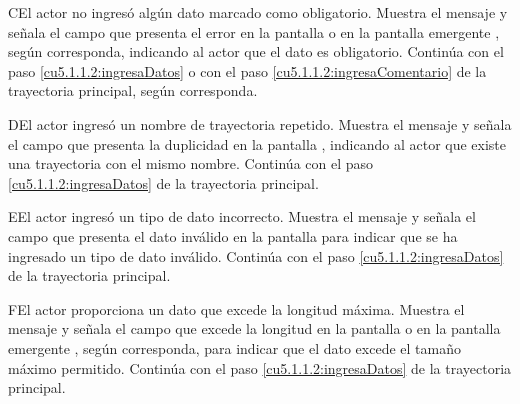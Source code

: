  \begin{UCtrayectoriaA}{C}{El actor no ingresó algún dato marcado como obligatorio.}
    \UCpaso[\UCsist] Muestra el mensaje  y señala el campo que presenta el error en la pantalla 
	     o en la pantalla emergente , según corresponda, indicando al actor que el dato es obligatorio.
    \UCpaso[] Continúa con el paso \ref{cu5.1.1.2:ingresaDatos} o con el paso \ref{cu5.1.1.2:ingresaComentario} de la trayectoria principal, según corresponda.
 \end{UCtrayectoriaA}
 \begin{UCtrayectoriaA}{D}{El actor ingresó un nombre de trayectoria repetido.}
    \UCpaso[\UCsist] Muestra el mensaje  y señala el campo que presenta la duplicidad en la pantalla 
	    , indicando al actor que existe una trayectoria con el mismo nombre.
    \UCpaso[] Continúa con el paso \ref{cu5.1.1.2:ingresaDatos} de la trayectoria principal.
 \end{UCtrayectoriaA}
 \begin{UCtrayectoriaA}{E}{El actor ingresó un tipo de dato incorrecto.}
    \UCpaso[\UCsist] Muestra el mensaje  y señala el campo que presenta el dato inválido en la 
    pantalla  para indicar que se ha ingresado un tipo de dato inválido.
    \UCpaso[] Continúa con el paso \ref{cu5.1.1.2:ingresaDatos} de la trayectoria principal.
 \end{UCtrayectoriaA}
 \begin{UCtrayectoriaA}{F}{El actor proporciona un dato que excede la longitud máxima.}
    \UCpaso[\UCsist] Muestra el mensaje  y señala el campo que excede la 
    longitud en la pantalla  o en la pantalla emergente , según corresponda, para indicar que el dato excede el tamaño máximo permitido.
    \UCpaso[] Continúa con el paso \ref{cu5.1.1.2:ingresaDatos} de la trayectoria principal.
 \end{UCtrayectoriaA}
 
